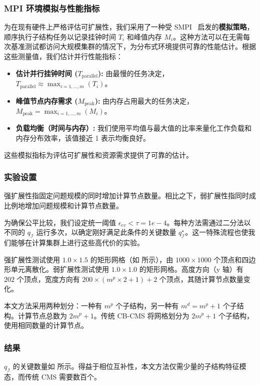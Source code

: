 \subsubsection{MPI 环境模拟与性能指标}
为在现有硬件上严格评估可扩展性，我们采用了一种受 SMPI~\cite{Degomme2017SMPI} 启发的\textbf{模拟策略}，顺序执行子结构任务以记录挂钟时间 $T_i$ 和峰值内存 $M_i$。这种方法可以在无需每次基准测试都访问大规模集群的情况下，为分布式环境提供可靠的性能估计。根据这些测量值，我们估计并行性能指标：
\begin{itemize}
    \item \textbf{估计并行挂钟时间 ($T_{\text{parallel}}$):} 由最慢的任务决定，$T_{\text{parallel}} \approx \max_{i=1,\dots,m} (T_i)$。
    \item \textbf{峰值节点内存需求 ($M_{\text{peak}}$):} 由内存占用最大的任务决定，$M_{\text{peak}} = \max_{i=1,\dots,m} (M_i)$。
    \item \textbf{负载均衡（时间与内存）:} 我们使用平均值与最大值的比率来量化工作负载和内存分布效率，该值接近 1 表示均衡良好。
\end{itemize}
这些模拟指标为评估可扩展性和资源需求提供了可靠的估计。

\subsubsection{实验设置}
强扩展性指固定问题规模的同时增加计算节点数量。相比之下，弱扩展性指同时成比例地增加问题规模和计算节点数量。

为确保公平比较，我们设定统一阈值 $\epsilon_{ev} < \tau=1e-4$。每种方法需通过二分法以不同的 $q_{\mathcal{I}}$ 运行多次，以确定刚好满足此条件的关键数量 $q_\mathcal{I}^\star$。这一特殊流程也使我们能够在计算集群上进行这些高代价的实验。

强扩展性测试使用 $1.0 \times 1.5$ 的矩形网格（如  所示），由 $1000 \times 1000$ 个顶点和四边形单元离散化。弱扩展性测试使用 $1.0 \times 1.0$ 的矩形网格。高度方向（y 轴）有 $202$ 个顶点，宽度方向有 $200 \times (m^p \times 2 + 1) + 2$ 个顶点，其随计算节点数量变化。

本文方法采用两种划分：一种有 $m^p$ 个子结构，另一种有 $m^d = m^p + 1$ 个子结构。计算节点总数为 $2m^p + 1$。传统 CB-CMS 将网格划分为 $2m^p + 1$ 个子结构，使用相同数量的计算节点。

\subsubsection{结果}
$q_{\mathcal{I}}$ 的关键数量如  所示。\textcolor{ConclusionEvidence}{得益于相位互补性，本文方法仅需少量的子结构特征模态，而传统 CMS 需要数百个。}

